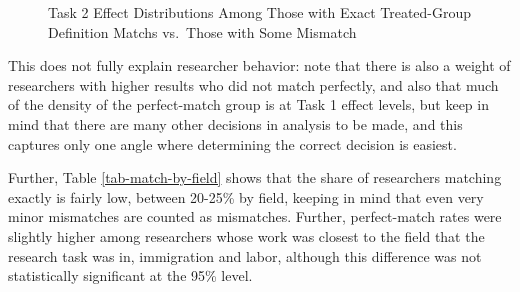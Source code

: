 \documentclass[
  letterpaper,
  DIV=11,
  numbers=noendperiod]{scrartcl}
\begin{document}
\begin{figure}


\caption{\label{fig-match-vs-mismatch}Task 2 Effect Distributions Among
Those with Exact Treated-Group Definition Matchs vs.~Those with Some
Mismatch}

\end{figure}%

This does not fully explain researcher behavior: note that there is also
a weight of researchers with higher results who did not match perfectly,
and also that much of the density of the perfect-match group is at Task
1 effect levels, but keep in mind that there are many other decisions in
analysis to be made, and this captures only one angle where determining
the correct decision is easiest.

Further, Table \ref{tab-match-by-field} shows that the share of
researchers matching exactly is fairly low, between 20-25\% by field,
keeping in mind that even very minor mismatches are counted as
mismatches. Further, perfect-match rates were slightly higher among
researchers whose work was closest to the field that the research task
was in, immigration and labor, although this difference was not
statistically significant at the 95\% level.
\end{document}
